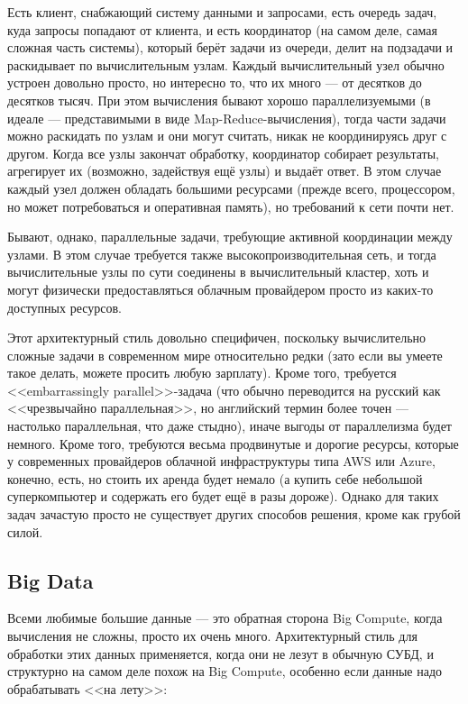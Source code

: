 \documentclass[a5paper]{article}
\begin{document}
Есть клиент, снабжающий систему данными и запросами, есть очередь задач, куда запросы попадают от клиента, и есть координатор (на самом деле, самая сложная часть системы), который берёт задачи из очереди, делит на подзадачи и раскидывает по вычислительным узлам. Каждый вычислительный узел обычно устроен довольно просто, но интересно то, что их много --- от десятков до десятков тысяч. При этом вычисления бывают хорошо параллелизуемыми (в идеале --- представимыми в виде Map-Reduce-вычисления), тогда части задачи можно раскидать по узлам и они могут считать, никак не координируясь друг с другом. Когда все узлы закончат обработку, координатор собирает результаты, агрегирует их (возможно, задействуя ещё узлы) и выдаёт ответ. В этом случае каждый узел должен обладать большими ресурсами (прежде всего, процессором, но может потребоваться и оперативная память), но требований к сети почти нет.

Бывают, однако, параллельные задачи, требующие активной координации между узлами. В этом случае требуется также высокопроизводительная сеть, и тогда вычислительные узлы по сути соединены в вычислительный кластер, хоть и могут физически предоставляться облачным провайдером просто из каких-то доступных ресурсов.

Этот архитектурный стиль довольно специфичен, поскольку вычислительно сложные задачи в современном мире относительно редки (зато если вы умеете такое делать, можете просить любую зарплату). Кроме того, требуется <<embarrassingly parallel>>-задача (что обычно переводится на русский как <<чрезвычайно параллельная>>, но английский термин более точен --- настолько параллельная, что даже стыдно), иначе выгоды от параллелизма будет немного. Кроме того, требуются весьма продвинутые и дорогие ресурсы, которые у современных провайдеров облачной инфраструктуры типа AWS или Azure, конечно, есть, но стоить их аренда будет немало (а купить себе небольшой суперкомпьютер и содержать его будет ещё в разы дороже). Однако для таких задач зачастую просто не существует других способов решения, кроме как грубой силой.

\subsection{Big Data}

Всеми любимые большие данные --- это обратная сторона Big Compute, когда вычисления не сложны, просто их очень много. Архитектурный стиль для обработки этих данных применяется, когда они не лезут в обычную СУБД, и структурно на самом деле похож на Big Compute, особенно если данные надо обрабатывать <<на лету>>:
\end{document}
